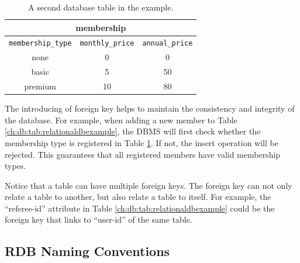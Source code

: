 \begin{table}
	\centering \caption{A second database table in the example.} \label{ch:db:tab:relationaldbexampleanother}
	\begin{tabular}{|c|c|c|}
		\hline
        \multicolumn{3}{|c|}{membership} \\ \hline
		\verb|membership_type| & \verb|monthly_price| & \verb|annual_price| \\ \hline
        none & 0 & 0 \\ \hline
        basic & 5 & 50 \\ \hline
        premium & 10 & 80 \\ \hline
	\end{tabular}
\end{table}

The introducing of foreign key helps to maintain the consistency and integrity of the database. For example, when adding a new member to Table \ref{ch:db:tab:relationaldbexample}, the DBMS will first check whether the membership type is registered in Table \ref{ch:db:tab:relationaldbexampleanother}. If not, the insert operation will be rejected. This guarantees that all registered members have valid membership types.

Notice that a table can have multiple foreign keys. The foreign key can not only relate a table to another, but also relate a table to itself. For example, the ``referee-id'' attribute in Table \ref{ch:db:tab:relationaldbexample} could be the foreign key that links to ``user-id'' of the same table.

\subsection{RDB Naming Conventions}


